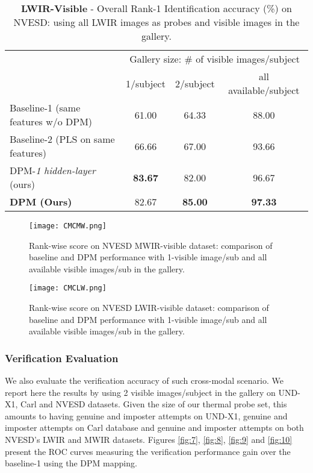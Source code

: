 \documentclass[smallextended,natbib]{svjour3}       \usepackage{graphicx}
\begin{document}
\begin{table}[t]
\centering
\begin{tabular}{@{}lccc@{}}
\toprule
                                 & \multicolumn{3}{c}{Gallery size: \# of visible images/subject} \\ \cmidrule(l){2-4} 
                                 & 1/subject         & 2/subject        & all available/subject   \\ \midrule
Baseline-1 (same features w/o DPM) & 61.00             & 64.33            & 88.00                   \\
Baseline-2 (PLS on same features) & 66.66             & 67.00            & 93.66                  \\
DPM-\textit{1 hidden-layer} (ours)             & \textbf{83.67}              & 82.00             & 96.67                   
\\
\textbf{DPM  (Ours)}             & 82.67    & \textbf{85.00}   & \textbf{97.33}          \\ \bottomrule
\end{tabular}
\caption{\textbf{LWIR-Visible} - Overall Rank-1 Identification accuracy (\%) on NVESD: using all LWIR images as probes and visible images in the gallery.}
\label{table:5}
\end{table}

\begin{figure}
  \begin{minipage}[t]{0.48\textwidth}  
    \texttt{[image: CMCMW.png]}
	\caption{Rank-wise score on NVESD MWIR-visible dataset: comparison of baseline and DPM performance with 1-visible image/sub and all available visible images/sub in the gallery.}
    \label{fig:5}
  \end{minipage}
  \hfill
  \begin{minipage}[t]{0.48\textwidth}
    \texttt{[image: CMCLW.png]}
\caption{Rank-wise score on NVESD LWIR-visible dataset: comparison of baseline and DPM performance with 1-visible image/sub and all available visible images/sub in the gallery.}    
  \label{fig:6}
  \end{minipage}
\end{figure}

\subsubsection{Verification Evaluation}
We also evaluate the verification accuracy of such cross-modal scenario. We report here the results by using 2 visible images/subject in the gallery on UND-X1, Carl and NVESD datasets. Given the size of our thermal probe set, this amounts to having  genuine and  imposter attempts on UND-X1,  genuine and  imposter attempts on Carl database and  genuine and  imposter attempts on both NVESD's LWIR and MWIR datasets. Figures \ref{fig:7}, \ref{fig:8}, \ref{fig:9} and \ref{fig:10} present the ROC curves measuring the verification performance gain over the baseline-1 using the DPM mapping.
\end{document}
